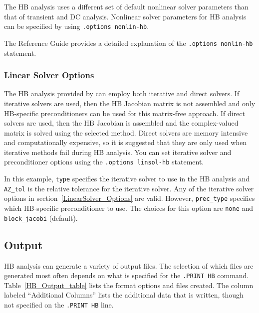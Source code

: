 The HB analysis uses a different set of default nonlinear solver parameters than
that of transient and DC analysis. Nonlinear solver parameters for HB
analysis can be specified by using \verb|.options nonlin-hb|.


The \Xyce{} Reference Guide\ReferenceGuide{} provides a detailed explanation of the \verb|.options nonlin-hb| statement.

\subsubsection{Linear Solver Options}

The HB analysis provided by \Xyce{} can employ both iterative and direct solvers.  If iterative
solvers are used, then the HB Jacobian matrix is not assembled and only HB-specific preconditioners
can be used for this matrix-free approach.  If direct solvers are used, then the HB
Jacobian is assembled and the complex-valued matrix is solved using the selected method.
Direct solvers are memory intensive and computationally expensive, so it is suggested that they
are only used when iterative methods fail during HB analysis. 
You can set iterative solver and preconditioner options using the \verb|.options linsol-hb| statement.


In this example, \texttt{type} specifies the iterative solver to use in
the HB analysis and \texttt{AZ\_tol} is the relative tolerance for the
iterative solver.  Any of the iterative solver options in
section~\ref{LinearSolver_Options} are valid.  However,
\texttt{prec\_type} specifies which HB-specific preconditioner to use. The
choices for this option are \texttt{none} and \texttt{block\_jacobi} (default).

\subsection{Output}
\label{HB_Output}

HB analysis can generate a variety of output files.  The
selection of which files are generated most often depends on what is specified
for the \texttt{.PRINT HB} command.
Table~\ref{HB_Output_table} lists the format options and files created.
The column labeled ``Additional Columns'' lists the additional data that
is written, though not specified on the \texttt{.PRINT HB} line.

